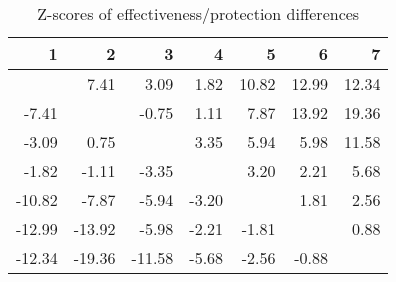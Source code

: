 \begin{table}[ht]
\centering
\begin{tabular}{rrrrrrr}
  \hline
1 & 2 & 3 & 4 & 5 & 6 & 7 \\ 
  \hline
 & 7.41 & 3.09 & 1.82 & 10.82 & 12.99 & 12.34 \\ 
  -7.41 &  & -0.75 & 1.11 & 7.87 & 13.92 & 19.36 \\ 
  -3.09 & 0.75 &  & 3.35 & 5.94 & 5.98 & 11.58 \\ 
  -1.82 & -1.11 & -3.35 &  & 3.20 & 2.21 & 5.68 \\ 
  -10.82 & -7.87 & -5.94 & -3.20 &  & 1.81 & 2.56 \\ 
  -12.99 & -13.92 & -5.98 & -2.21 & -1.81 &  & 0.88 \\ 
  -12.34 & -19.36 & -11.58 & -5.68 & -2.56 & -0.88 &  \\ 
   \hline
\end{tabular}
\caption{Z-scores of effectiveness/protection differences} 
\end{table}
